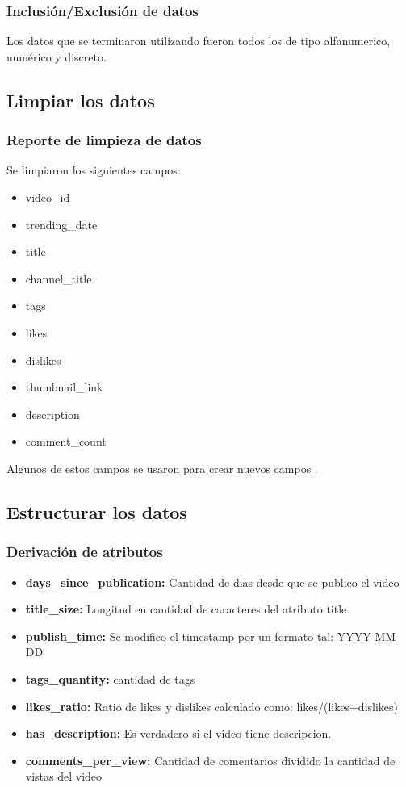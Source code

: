     \subsubsection{Inclusión/Exclusión de datos}
        Los datos que se terminaron utilizando fueron todos los de tipo
        alfanumerico, numérico y discreto.

\subsection{Limpiar los datos}
    \subsubsection{Reporte de limpieza de datos}
        Se limpiaron los siguientes campos:
        \begin{itemize}
            \item video\_id
            \item trending\_date
            \item title
            \item channel\_title
            \item tags
            \item likes
            \item dislikes
            \item thumbnail\_link
            \item description
            \item comment\_count
        \end{itemize}
        Algunos de estos campos se usaron para crear nuevos campos
        .
\subsection{Estructurar los datos}
    \subsubsection{Derivación de atributos}
        \begin{itemize}
            \item \textbf{days\_since\_publication:} Cantidad de dias desde que se publico el video
            \item \textbf{title\_size:} Longitud en cantidad de caracteres del atributo title
            \item \textbf{publish\_time:} Se modifico el timestamp por un formato tal: YYYY-MM-DD
            \item \textbf{tags\_quantity:} cantidad de tags
            \item \textbf{likes\_ratio:} Ratio de likes y dislikes calculado como: likes/(likes+dislikes)
            \item \textbf{has\_description:} Es verdadero si el video tiene descripcion.
            \item \textbf{comments\_per\_view:} Cantidad de comentarios dividido la cantidad de vistas del video
        \end{itemize}
